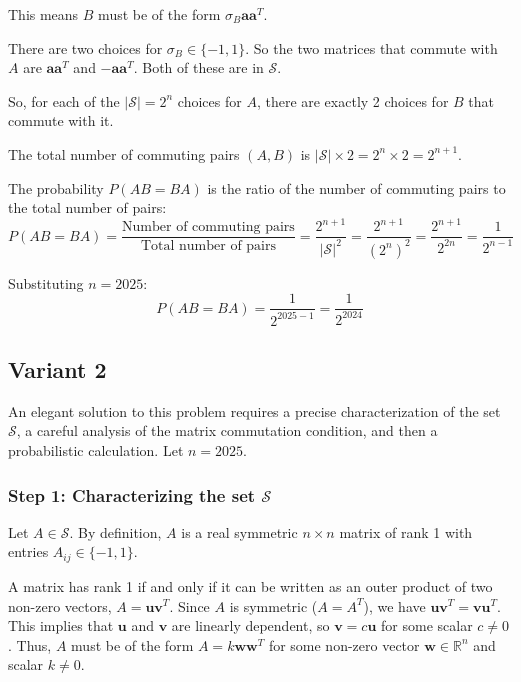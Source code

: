 \documentclass[12pt,a4paper]{article}
\theoremstyle{definition}
\begin{document}
        This means $B$ must be of the form $\sigma_B \mathbf{a}\mathbf{a}^T$.

        There are two choices for $\sigma_B \in \{-1, 1\}$. So the two matrices that commute with $A$ are $\mathbf{a}\mathbf{a}^T$ and $-\mathbf{a}\mathbf{a}^T$. Both of these are in $\mathcal{S}$.

        So, for each of the $|\mathcal{S}| = 2^n$ choices for $A$, there are exactly 2 choices for $B$ that commute with it.

        The total number of commuting pairs $(A, B)$ is $|\mathcal{S}| \times 2 = 2^n \times 2 = 2^{n+1}$.

        The probability $P(AB=BA)$ is the ratio of the number of commuting pairs to the total number of pairs:
        $$P(AB=BA) = \frac{\text{Number of commuting pairs}}{\text{Total number of pairs}} = \frac{2^{n+1}}{|\mathcal{S}|^2} = \frac{2^{n+1}}{(2^n)^2} = \frac{2^{n+1}}{2^{2n}} = \frac{1}{2^{n-1}}$$

        Substituting $n = 2025$:
        $$P(AB=BA) = \frac{1}{2^{2025-1}} = \frac{1}{2^{2024}}$$

        \subsection{Variant 2}

        An elegant solution to this problem requires a precise characterization of the set $\mathcal{S}$, a careful analysis of the matrix commutation condition, and then a probabilistic calculation. Let $n = 2025$.

        \subsubsection*{Step 1: Characterizing the set $\mathcal{S}$}

        Let $A \in \mathcal{S}$. By definition, $A$ is a real symmetric $n \times n$ matrix of rank 1 with entries $A_{ij} \in \{-1, 1\}$.

        A matrix has rank 1 if and only if it can be written as an outer product of two non-zero vectors, $A = \mathbf{u}\mathbf{v}^T$. Since $A$ is symmetric ($A=A^T$), we have $\mathbf{u}\mathbf{v}^T = \mathbf{v}\mathbf{u}^T$. This implies that $\mathbf{u}$ and $\mathbf{v}$ are linearly dependent, so $\mathbf{v} = c\mathbf{u}$ for some scalar $c \neq 0$. Thus, $A$ must be of the form $A = k \mathbf{w}\mathbf{w}^T$ for some non-zero vector $\mathbf{w} \in \mathbb{R}^n$ and scalar $k \neq 0$.
\end{document}
